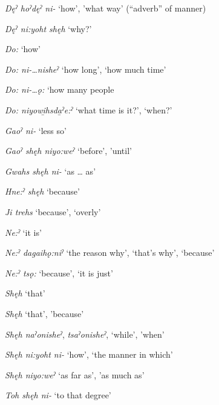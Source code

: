 \begin{CayugaRelated}
\item{}\textit{Dęˀ hoˀdęˀ ni-} ‘how’, 'what way’ (“adverb” of manner)\\
\item{}\textit{Dęˀ ni:yoht shęh} ‘why?’\\
\item{}\textit{Do:} ‘how’\\
\item{}\textit{Do: ni-…nisheˀ} ‘how long’, ‘how much time’\\
\item{}\textit{Do: ni-…ǫ:} ‘how many people\\
\item{}\textit{Do: niyowi̱hsda̱ˀe:ˀ} ‘what time is it?’, ‘when?’\\
\item{}\textit{Gaoˀ ni-} ‘less so’\\
\item{}\textit{Gaoˀ shęh niyo:weˀ} ‘before’, 'until’\\
\item{}\textit{Gwahs shęh ni-} ‘as … as’\\
\item{}\textit{Hne:ˀ shęh} ‘because’\\
\item{}\textit{Ji trehs} ‘because’, ‘overly’\\
\item{}\textit{Ne:ˀ} ‘it is’\\
\item{}\textit{Ne:ˀ dagaihǫ:niˀ} ‘the reason why’, ‘that’s why’, ‘because’\\
\item{}\textit{Ne:ˀ tsǫ:} ‘because’, ‘it is just’\\
\item{}\textit{Shęh} ‘that’\\
\item{}\textit{Shęh} ‘that’, 'because’\\
\item{}\textit{Shęh naˀonisheˀ}, \textit{tsaˀonisheˀ},  ‘while’, 'when’\\
\item{}\textit{Shęh ni:yoht ni-} ‘how’, ‘the manner in which’\\
\item{}\textit{Shęh niyo:weˀ} ‘as far as’, 'as much as’\\
\item{}\textit{Toh shęh ni-} ‘to that degree’\\
\end{CayugaRelated}

